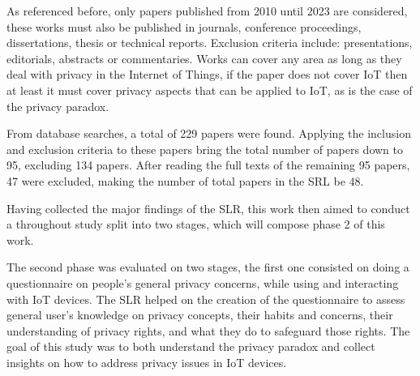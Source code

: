 


As referenced before, only papers published from 2010 until 2023 are considered,
these works must also be published in journals, conference proceedings, dissertations,
thesis or technical reports. Exclusion criteria include: presentations, editorials,
abstracts or commentaries. Works can cover any area as long as they deal with
privacy in the Internet of Things, if the paper does not cover IoT then at least
it must cover privacy aspects that can be applied to IoT, as is the case of the
privacy paradox.

From database searches, a total of 229 papers were found. Applying the inclusion
and exclusion criteria to these papers bring the total number of papers down to
95, excluding 134 papers. After reading the full texts of the remaining 95 papers,
47 were excluded, making the number of total papers in the SRL be 48.

Having collected the major findings of the SLR, this work then aimed to conduct a
throughout study split into two stages, which will compose phase 2 of this work.




The second phase was evaluated on two stages, the first one consisted
on doing a questionnaire on people's general privacy concerns, while using and interacting
with IoT devices. The SLR helped on the creation of the questionnaire to
assess general user's knowledge on privacy concepts, their habits and concerns,
their understanding of privacy rights, and what they do to safeguard those
rights. The goal of this study was to both understand the privacy paradox
and collect insights on how to address privacy issues in IoT devices.

